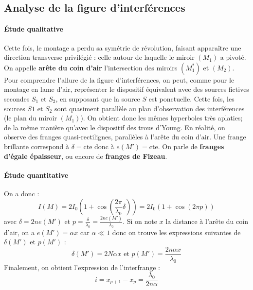 \documentclass[french]{book}
\theoremstyle{plain}
\theoremstyle{definition}
\theoremstyle{remark}
\newcommand{\st}{^*}
\begin{document}
\subsection{Analyse de la figure d'interférences}
\paragraph{Étude qualitative} Cette fois, le montage a perdu sa symétrie de révolution, faisant apparaître une direction transverse privilégié : celle autour de laquelle le miroir $(M_1)$ a pivoté. On appelle \textbf{arête du coin d'air} l'intersection des miroirs $(M_1\st)$ et $(M_2)$. Pour comprendre l'allure de la figure d'interférences, on peut, comme pour le montage en lame d'air, représenter le dispositif équivalent avec des sources fictives secondes $S_1$ et $S_2$, en supposant que la source $S$ est ponctuelle. Cette fois, les sources $S1$ et $S_2$ sont quasiment parallèle au plan d'observation des interférences (le plan du miroir $(M_1)$). On obtient donc les mêmes hyperboles très aplaties; de la même manière qu'avec le dispositif des trous d'Young. En réalité, on observe des franges quasi-rectilignes, parallèles à l'arête du coin d'air. Une frange brillante correspond à $\delta=\text{cte}$ donc à $e(M')=\text{cte}$. On parle de \textbf{franges d'égale épaisseur}, ou encore de \textbf{franges de Fizeau}.
\paragraph{Étude quantitative} On a donc : $$I(M)=2I_0\left(1+\cos\left(\frac{2\pi}{\lambda_0}\delta\right)\right)=2I_0(1+\cos(2\pi p))$$ avec $\delta=2ne(M')$ et $\displaystyle p=\frac{\delta}{\lambda_0}=\frac{2ne(M')}{\lambda_0}$. Si on note $x$ la distance à l'arête du coin d'air, on a $e(M')=\alpha x$ car $\alpha\ll 1$ donc on trouve les expressions suivantes de $\delta(M')$ et $p(M')$ : $$\delta(M')=2N\alpha x\text{  et  }p(M')=\frac{2n\alpha x}{\lambda_0}$$ Finalement, on obtient l'expression de l'interfrange : $$i=x_{p+1}-x_p=\frac{\lambda_0}{2n\alpha}$$
\end{document}
